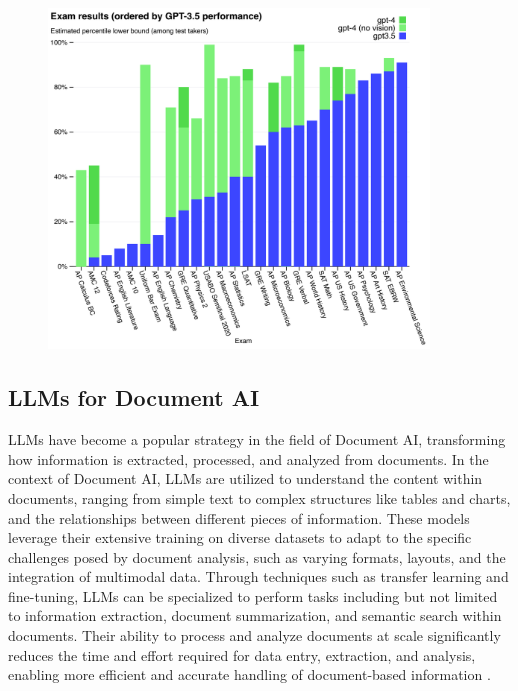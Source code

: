 \documentclass[english, 12pt, a4paper, elec, utf8, a-2b, online]{aaltothesis}
\begin{document}
\begin{figure}[H]
    \centering
    \includegraphics[width=0.9\textwidth]{images/gpt_exam_results.png}
    \caption{}
    \label{fig:transformers_milestones}
\end{figure}

\subsection{LLMs for Document AI}

\ac{LLM}s have become a popular strategy in the field of Document AI, transforming how information is extracted, processed, and analyzed from documents.
In the context of Document AI, \ac{LLM}s are utilized to understand the content within documents, ranging from simple text to complex structures like tables and charts, and the relationships between different pieces of information.
These models leverage their extensive training on diverse datasets to adapt to the specific challenges posed by document analysis, such as varying formats, layouts, and the integration of multimodal data.
Through techniques such as transfer learning and fine-tuning, \ac{LLM}s can be specialized to perform tasks including but not limited to information extraction, document summarization, and semantic search within documents.
Their ability to process and analyze documents at scale significantly reduces the time and effort required for data entry, extraction, and analysis, enabling more efficient and accurate handling of document-based information \cite{}.
\end{document}
